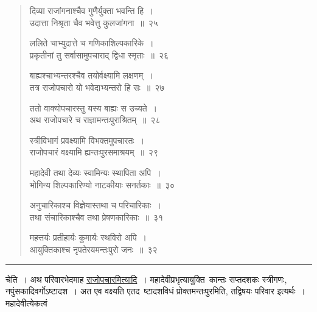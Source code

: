 \documentclass[11pt, openany]{book}
\begin{document}
\begin{quote}
{\na दिव्या राजांगनाश्चैव गुणैर्युक्ता भवन्ति हि~।\\
उदात्ता निश्रृता चैव भवेत्तु कुलजांगना~॥~२५

ललिते चाभ्युदात्ते च गणिकाशिल्पकारिके~।\\
प्रकृतीनां तु सर्वासामुपचाराद् द्विधा स्मृताः~॥~२६

बाह्यश्चाभ्यन्तरश्चैव तयोर्वक्ष्यामि लक्षणम्~।\\
तत्र राजोपचारो यो भवेदाभ्यन्तरो हि सः~॥~२७

ततो वाक्योपचारस्तु यस्य बाह्यः स उच्यते~।\\
अथ राजोपचारे च राज्ञामन्तःपुराश्रितम्~॥~२८

स्त्रीविभागं प्रवक्ष्यामि विभक्तमुपचारतः~।\\
राजोपचारं वक्ष्यामि ह्यन्तःपुरसमाश्रयम्~॥~२९

महादेवी तथा देव्यः स्वामिन्यः स्थापिता अपि~।\\
भोगिन्य शिल्पकारिण्यो नाटकीयाः सनर्तकाः~॥~३०

अनुचारिकाश्च विज्ञेयास्तथा च परिचारिकाः~।\\
तथा संचारिकाश्चैव तथा प्रेषणकारिकाः~॥~३१

महत्तर्यः प्रतीहार्यः कुमार्यः स्थविरो अपि~।\\
आयुक्तिकाश्च नृपतेरयमन्तःपुरो जनः~॥~३२}
\end{quote}

\hrule

\vspace{2mm}
\noindent
चेति~। अथ परिवारभेदमाह \underline{राजोपचारमित्यादि}~। महादेवीप्रभृत्यायुक्ति\textendash\ कान्तः सप्तदशकः स्त्रीगणः, नपुंसकादिवर्गोऽष्टादश~। अत एव वक्ष्यति एतद\textendash\ ष्टादशविधं प्रोक्तमन्तःपुरमिति, तद्विषयः परिवार इत्यर्थः~। महादेवीत्येकत्वं\textendash

\newpage
\end{document}
